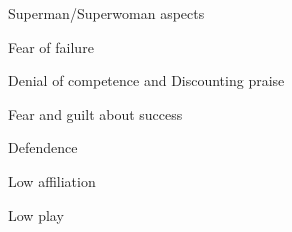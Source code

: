 \documentclass[aspectratio=169]{beamer}
\begin{document}
\begin{frame}
  \begin{center}
    \Huge Superman/Superwoman aspects
    \\ \small \cite{sakulku11}
  \end{center}
\end{frame}

\begin{frame}
  \begin{center}
    \Huge Fear of failure
    \\ \small \cite{sakulku11}
  \end{center}
\end{frame}

\begin{frame}
  \begin{center}
    \Huge Denial of competence and Discounting praise
    \\ \small \cite{sakulku11}
  \end{center}
\end{frame}

\begin{frame}
  \begin{center}
    \Huge Fear and guilt about success
    \\ \small \cite{sakulku11}
  \end{center}
\end{frame}

\begin{frame}
  \begin{center}
    \Huge Defendence
    \\ \small \cite{langford93}
  \end{center}
\end{frame}

\begin{frame}
  \begin{center}
    \Huge Low affiliation
    \\ \small \cite{langford93}
  \end{center}
\end{frame}

\begin{frame}
  \begin{center}
    \Huge Low play
    \\ \small \cite{langford93}
  \end{center}
\end{frame}
\end{document}
